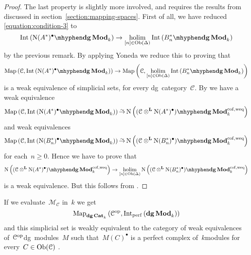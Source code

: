 \begin{refsection}
\begin{theorem}
\begin{proof}[Proof]
    The last property is slightly more involved, and requires the results from \cite{toen-homotopy-theory-of-dg-categories} discussed in section~\ref{section:mapping-spaces}. First of all, we have reduced \eqref{equation:condition-3} to
    \begin{equation}
      \Int\left( \dgMod{\nerve(A^*)^\bullet}_k \right)\to\holim_{[n]\in\Ob(\Delta)}\Int\left( \dgMod{B_n^*}_k \right)
    \end{equation}
    by the previous remark. By applying Yoneda we reduce this to proving that
    \begin{equation}
      \Map\left( \mathcal{C},\Int\left( \dgMod{\nerve(A^*)^\bullet}_k \right) \right)\to\Map\left( \mathcal{C},\holim_{[n]\in\Ob(\Delta)}\Int\left( \dgMod{B_n^*}_k \right) \right)
    \end{equation}
    is a weak equivalence of simplicial sets, for every dg~category~$\mathcal{C}$. By \cite[theorem 4.2]{toen-homotopy-theory-of-dg-categories} we have a weak equivalence
    \begin{equation}
      \Map\left( \mathcal{C},\Int\left( \dgMod{\nerve(A^*)^\bullet}_k \right) \right)\weq\nerve\left( \dgMod{(\mathcal{C}\otimes^{\mathbf{L}}\nerve(A^*)^\bullet)}_k^{\mathrm{cof,weq}} \right)
    \end{equation}
    and weak equivalences
    \begin{equation}
      \Map\left( \mathcal{C},\Int\left( \dgMod{\nerve(B_n^*)^\bullet}_k \right) \right)\weq\nerve\left( \dgMod{(\mathcal{C}\otimes^{\mathbf{L}}\nerve(B_n^*)^\bullet)}_k^{\mathrm{cof,weq}} \right)
    \end{equation}
    for each~$n\geq 0$. Hence we have to prove that
    \begin{equation}
      \nerve\left( \dgMod{(\mathcal{C}\otimes^{\mathbf{L}}\nerve(A^*)^\bullet)}_k^{\mathrm{cof,weq}} \right)\to\holim_{[n]\in\Ob(\Delta)}\nerve\left( \dgMod{(\mathcal{C}\otimes^{\mathbf{L}}\nerve(B_n^*)^\bullet)}_k^{\mathrm{cof,weq}} \right)
    \end{equation}
    is a weak equivalence. But this follows from \cite[corollary B.0.8]{toen-vezzosi-hag-II}.
  \end{proof}
\end{theorem}

\begin{example}
  If we evaluate~$\mathcal{M}_{\mathcal{C}}$ in~$k$ we get
  \begin{equation}
    \Map_{\dgCat_k}\left( \mathcal{C}^\opp,\Int_\perf\left( \dgMod_k \right) \right)
  \end{equation}
  and this simplicial set is weakly equivalent to the category of weak equivalences of~$\mathcal{C}^{\mathrm{op}}$\dash dg~modules~$M$ such that~$M(C)^\bullet$ is a perfect complex of~$k$\dash modules for every~$C\in\operatorname{Ob}(\mathcal{C})$ \cite[corollary 7.6]{toen-homotopy-theory-of-dg-categories}.
\end{example}



\end{refsection}
